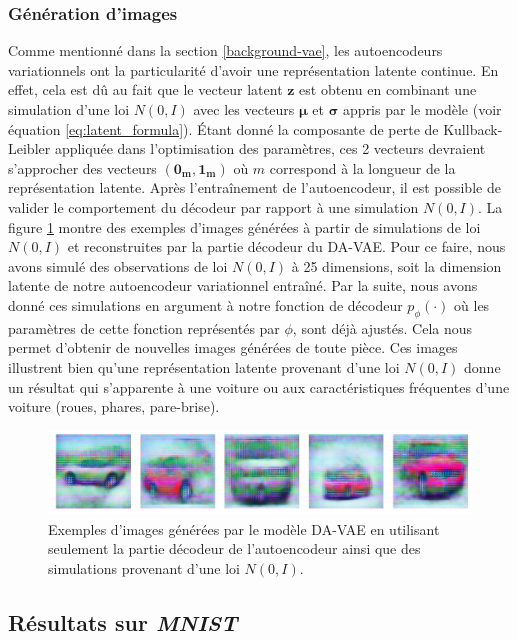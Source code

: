 \subsubsection{Génération d'images}

Comme mentionné dans la section \ref{background-vae}, les autoencodeurs variationnels ont la particularité d'avoir une représentation latente continue. En effet, cela est dû au fait que le vecteur latent $\boldsymbol{z}$ est obtenu en combinant une simulation d'une loi $N(0,I)$ avec les vecteurs $\boldsymbol{\mu}$ et $\boldsymbol{\sigma}$ appris par le modèle (voir équation \ref{eq:latent_formula}). Étant donné la composante de perte de Kullback-Leibler appliquée dans l'optimisation des paramètres, ces 2 vecteurs devraient s'approcher des vecteurs $(\boldsymbol{0_{m}}, \boldsymbol{1_{m}})$ où $m$ correspond à la longueur de la représentation latente. Après l'entraînement de l'autoencodeur, il est possible de valider le comportement du décodeur par rapport à une simulation $N(0,I)$. La figure \ref{fig:generated_cars} montre des exemples d'images générées à partir de simulations de loi $N(0,I)$ et reconstruites par la partie décodeur du DA-VAE. Pour ce faire, nous avons simulé des observations de loi $N(0,I)$ à 25 dimensions, soit la dimension latente de notre autoencodeur variationnel entraîné. Par la suite, nous avons donné ces simulations en argument à notre fonction de décodeur $p_{\phi}(\cdot)$ où les paramètres de cette fonction représentés par $\phi$, sont déjà ajustés. Cela nous permet d'obtenir de nouvelles images générées de toute pièce. Ces images illustrent bien qu'une représentation latente provenant d'une loi $N(0,I)$ donne un résultat qui s'apparente à une voiture ou aux caractéristiques fréquentes d'une voiture (roues, phares, pare-brise).

\begin{figure}[htb]
	\centering
	\includegraphics[width=\textwidth]{images/generated_cars}
	\caption{Exemples d'images générées par le modèle DA-VAE en utilisant seulement la partie décodeur de l'autoencodeur ainsi que des simulations provenant d'une loi $N(0,I)$.}
	\label{fig:generated_cars}
\end{figure}

\subsection{Résultats sur \textit{MNIST}}

